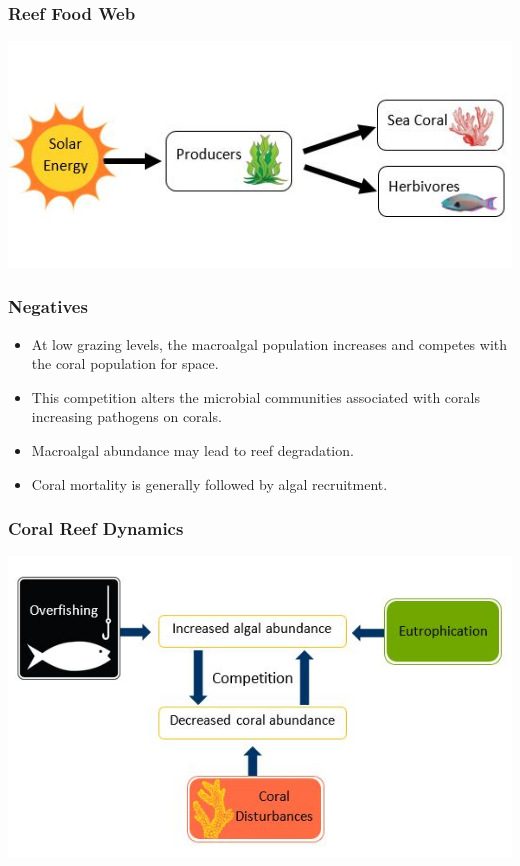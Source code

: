 \begin{frame}
\frametitle{Reef Food Web}
\includegraphics[scale=.8]{./CoralFoodWeb}
\end{frame}

\begin{frame}
\frametitle{Negatives}
\begin{itemize}
\item At low grazing levels, the macroalgal population increases and competes with the coral population for space.
\item This competition alters the microbial communities associated with corals increasing pathogens on corals.
\item Macroalgal abundance may lead to reef degradation.
\item Coral mortality is generally followed by algal recruitment.
\end{itemize}
\end{frame}

\begin{frame}
\frametitle{Coral Reef Dynamics}
\includegraphics[scale=.7]{./CoralDynamics}
\end{frame}

